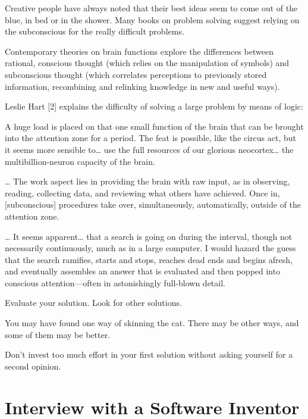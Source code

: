 Creative people have always noted that their best ideas seem to
come out of the blue, in bed or in the shower. Many books on problem
solving suggest relying on the subconscious for the really difficult
problems.

Contemporary theories on brain functions explore the differences
between rational, conscious thought (which relies on the manipulation of
symbols) and subconscious thought (which correlates perceptions to
previously stored information, recombining and relinking knowledge in
new and useful ways).

Leslie Hart [2] explains the difficulty of solving a large problem by
means of logic:

\begin{tfquot}
A huge load is placed on that one small function of the brain that can be
brought into the attention zone for a period. The feat is possible, like the
circus act, but it seems more sensible to\dots{} use the full resources of our
glorious neocortex\dots{} the multibillion-neuron capacity of the brain.

\dots{} The work aspect lies in providing the brain with raw input, as in
observing, reading, collecting data, and reviewing what others have achieved.
Once in, [subconscious] procedures take over, simultaneously, automatically,
outside of the attention zone.

\dots{} It seems apparent\dots{} that a search is going on during the interval,
though not necessarily continuously, much as in a large computer. I would
hazard the guess that the search ramifies, starts and stops, reaches dead
ends and begins afresh, and eventually assembles an answer that is
evaluated and then popped into conscious attention---often in astonishingly
full-blown detail.
\end{tfquot}
\begin{tip}
Evaluate your solution. Look for other solutions.
\end{tip}
You may have found one way of skinning the cat. There may be other
ways, and some of them may be better.

Don't invest too much effort in your first solution without asking
yourself for a second opinion.


\section{Interview with a Software Inventor}

